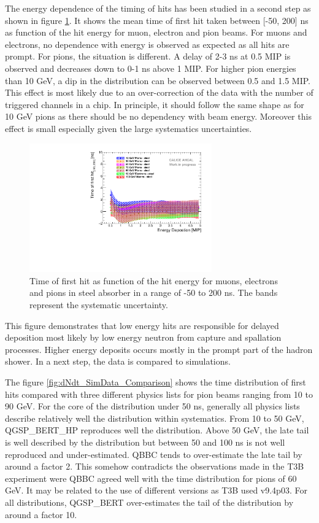 The energy dependence of the timing of hits has been studied in a second step as shown in figure \ref{fig:Energy_Comparison}. It shows the mean time of first hit taken between [-50, 200] ns as function of the hit energy for muon, electron and pion beams. For muons and electrons, no dependence with energy is observed as expected as all hits are prompt. For pions, the situation is different. A delay of 2-3 ns at 0.5 MIP is observed and decreases down to 0-1 ns above 1 MIP. For higher pion energies than 10 GeV, a dip in the distribution can be observed between 0.5 and 1.5 MIP. This effect is most likely due to an over-correction of the data with the number of triggered channels in a chip. In principle, it should follow the same shape as for 10 GeV pions as there should be no dependency with beam energy. Moreover this effect is small especially given the large systematics uncertainties.

\begin{figure}[htbp!]
	\centering
	\includegraphics[width=0.7\textwidth]{../Thesis_Plots/Timing/Pions/Plots/Timing_Energy_Comparison_ShortAsymRange.pdf}
	\caption{Time of first hit as function of the hit energy for muons, electrons and pions in steel absorber in a range of -50 to 200 ns. The bands represent the systematic uncertainty.}
	\label{fig:Energy_Comparison}
\end{figure}

This figure demonstrates that low energy hits are responsible for delayed deposition most likely by low energy neutron from capture and spallation processes. Higher energy deposits occurs mostly in the prompt part of the hadron shower. In a next step, the data is compared to simulations.

The figure \ref{fig:dNdt_SimData_Comparison} shows the time distribution of first hits compared with three different physics lists for pion beams ranging from 10 to 90 GeV. For the core of the distribution under 50 ns, generally all physics lists describe relatively well the distribution within systematics. From 10 to 50 GeV, QGSP\_BERT\_HP reproduces well the distribution. Above 50 GeV, the late tail is well described by the distribution but between 50 and 100 ns is not well reproduced and under-estimated. QBBC tends to over-estimate the late tail by around a factor 2. This somehow contradicts the observations made in the T3B experiment were QBBC agreed well with the time distribution for pions of 60 GeV. It may be related to the use of different \geant versions as T3B used \geant v9.4p03. For all distributions, QGSP\_BERT over-estimates the tail of the distribution by around a factor 10.

